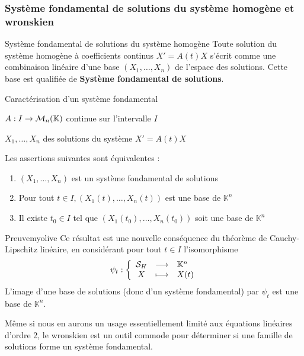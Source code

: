     \subsubsection{Système fondamental de solutions du système homogène et wronskien}

    \begin{defi}{Système fondamental de solutions du système homogène}{}
        Toute solution du système homogène à coefficients continus $X' = A(t)X$ s’écrit comme une combinaison linéaire d’une base $(X_1,\ldots,X_n)$ de l’espace des solutions. Cette base est qualifiée de \textbf{Système fondamental de solutions}.
    \end{defi}

    \begin{prop}{Caractérisation d’un système fondamental}{}
        \begin{soient}
            \item $A : I \rightarrow \mathcal{M}_{n}(\mathbb{K})$ continue sur l’intervalle $I$
            \item $X_1,\ldots,X_n$ des solutions du système $X' = A(t)X$
        \end{soient}
        Les assertions suivantes sont équivalentes :
        \begin{enumerate}
            \item $(X_1,\ldots,X_n)$ est un système fondamental de solutions 
            \item Pour tout $t \in I, (X_1(t),\ldots,X_n(t))$ est une base de $\mathbb{K}^n$
            \item Il existe $t_0 \in I$ tel que $(X_1(t_0),\ldots,X_n(t_0))$ soit une base de $\mathbb{K}^n$
        \end{enumerate}
    \end{prop}

    \begin{demo}{Preuve}{myolive}
        Ce résultat est une nouvelle conséquence du théorème de Cauchy-Lipschitz linéaire, en considérant pour tout $t \in I$ l’isomorphisme 
        \[ \fonction{\psi_t}{\mathcal{S}_H}{\mathbb{K}^n}{X}{X(t)} \] 
        L’image d’une base de solutions (donc d’un système fondamental) par $\psi_t$ est une base de $\mathbb{K}^n$.
    \end{demo}

    Même si nous en aurons un usage essentiellement limité aux équations linéaires d’ordre 2, le wronskien est un outil commode pour déterminer si une famille de solutions forme un système fondamental.

